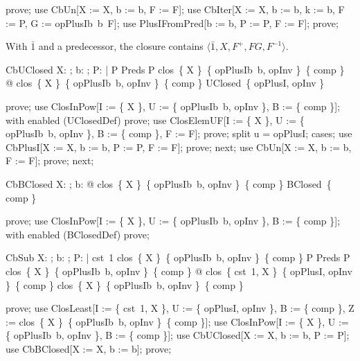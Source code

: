 \documentclass{article}
\begin{document}
\begin{zproof}
prove;
use CbUn[X := X, b := b, F := F];
use CbIter[X := X, b := b, k := b, F := P, G := opPlusIb~b~F];
use PlusIFromPred[b := b, P := P, F := F];
prove;
\end{zproof}

With $\bar 1$ and a predecessor, the closure contains $\langle \bar 1, X, F^+, FG, F^{-1}\rangle$.

\begin{theorem}{CbUClosed}
  \forall X: \nat \fun \nat; b: \nat; P: \nat \fun \nat | P \in Preds \land P \in clos~\{ X \}~\{ opPlusIb~b, opInv \}~\{ comp \} @ clos~\{ X \}~\{ opPlusIb~b, opInv \}~\{ comp \} \in UClosed~\{ opPlusI, opInv \}
\end{theorem}

\begin{zproof}
prove;
use ClosInPow[I := \{ X \}, U := \{ opPlusIb~b, opInv \}, B := \{ comp \}];
with enabled (UClosedDef) prove;
use ClosElemUF[I := \{ X \}, U := \{ opPlusIb~b, opInv \}, B := \{ comp \}, F := F];
prove;
split u = opPlusI;
cases;
use CbPlusI[X := X, b := b, P := P, F := F];
prove;
next;
use CbUn[X := X, b := b, F := F];
prove;
next;
\end{zproof}

\begin{theorem}{CbBClosed}
  \forall X: \nat \fun \nat; b: \nat @ clos~\{ X \}~\{ opPlusIb~b, opInv \}~\{ comp \} \in BClosed~\{ comp \}
\end{theorem}

\begin{zproof}
prove;
use ClosInPow[I := \{ X \}, U := \{ opPlusIb~b, opInv \}, B := \{ comp \}];
with enabled (BClosedDef) prove;
\end{zproof}

\begin{theorem}{CbSub}
  \forall X: \nat \fun \nat; b: \nat; P: \nat \fun \nat | cst~1 \in clos~\{ X \}~\{ opPlusIb~b, opInv \}~\{ comp \} \land P \in Preds \land P \in clos~\{ X \}~\{ opPlusIb~b, opInv \}~\{ comp \} @ clos~\{ cst~1, X \}~\{ opPlusI, opInv \}~\{ comp \} \subseteq clos~\{ X \}~\{ opPlusIb~b, opInv \}~\{ comp \}
\end{theorem}

\begin{zproof}
prove;
use ClosLeast[I := \{ cst~1, X \}, U := \{ opPlusI, opInv \}, B := \{ comp \}, Z := clos~\{ X \}~\{ opPlusIb~b, opInv \}~\{ comp \}];
use ClosInPow[I := \{ X \}, U := \{ opPlusIb~b, opInv \}, B := \{ comp \}];
use CbUClosed[X := X, b := b, P := P];
use CbBClosed[X := X, b := b];
prove;
\end{zproof}
\end{document}
